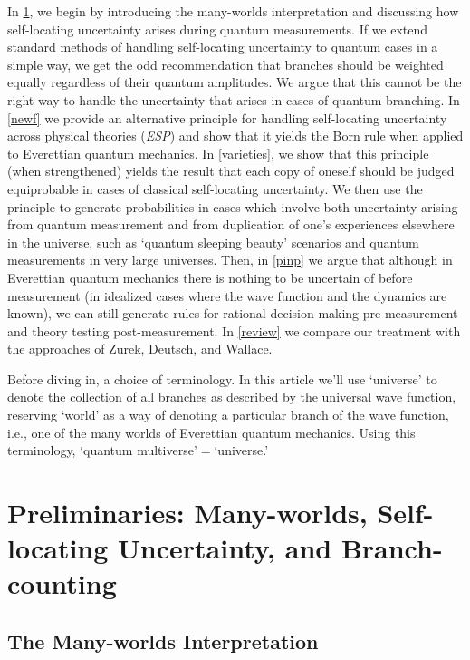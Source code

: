 \documentclass[12pt,onecolumn,secnumarabic,amsmath,amssymb,balancelastpage,nofootinbib]{article}
\begin{document}
In \textsection \ref{prelim}, we begin by introducing the many-worlds interpretation and discussing how self-locating uncertainty arises during quantum measurements.  If we extend standard methods of handling self-locating uncertainty to quantum cases in a simple way, we get the odd recommendation that branches should be weighted equally regardless of their quantum amplitudes.  We argue that this cannot be the right way to handle the uncertainty that arises in cases of quantum branching.  In \textsection \ref{newf} we provide an alternative principle for handling self-locating uncertainty across physical theories (\emph{ESP}) and show that it yields the Born rule when applied to Everettian quantum mechanics.  In \textsection \ref{varieties}, we show that this principle (when strengthened) yields the result that each copy of oneself should be judged equiprobable in cases of classical self-locating uncertainty.  We then use the principle to generate probabilities in cases which involve both uncertainty arising from quantum measurement and from duplication of one's experiences elsewhere in the universe, such as `quantum sleeping beauty' scenarios and quantum measurements in very large universes.  Then, in \textsection \ref{pinp} we argue that although in Everettian quantum mechanics there is nothing to be uncertain of before measurement (in idealized cases where the wave function and the dynamics are known), we can still generate rules for rational decision making pre-measurement and theory testing post-measurement.  In \textsection \ref{review} we compare our treatment with the approaches of Zurek, Deutsch, and Wallace.

Before diving in, a choice of terminology.  In this article we'll use `universe' to denote the collection of all branches as described by the universal wave function,  reserving `world' as a way of denoting a particular branch of the wave function, i.e., one of the many worlds of Everettian quantum mechanics.  Using this terminology, `quantum multiverse'$=$`universe.'

\section{Preliminaries: Many-worlds, Self-locating Uncertainty, and Branch-counting}\label{prelim}

\subsection{The Many-worlds Interpretation}\label{introducingEQM}
\end{document}
